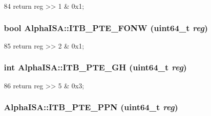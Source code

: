 \begin{DoxyCode}
84 { return reg >> 1 & 0x1; }
\end{DoxyCode}
\hypertarget{namespaceAlphaISA_aa80ea9dd70abdb33c458d4f99d4b3491}{
\subsubsection[{ITB\_\-PTE\_\-FONW}]{\setlength{\rightskip}{0pt plus 5cm}bool AlphaISA::ITB\_\-PTE\_\-FONW (uint64\_\-t {\em reg})}}
\label{namespaceAlphaISA_aa80ea9dd70abdb33c458d4f99d4b3491}



\begin{DoxyCode}
85 { return reg >> 2 & 0x1; }
\end{DoxyCode}
\hypertarget{namespaceAlphaISA_a9640ea9e1d42b4e0f47250c7efe687f9}{
\subsubsection[{ITB\_\-PTE\_\-GH}]{\setlength{\rightskip}{0pt plus 5cm}int AlphaISA::ITB\_\-PTE\_\-GH (uint64\_\-t {\em reg})}}
\label{namespaceAlphaISA_a9640ea9e1d42b4e0f47250c7efe687f9}



\begin{DoxyCode}
86 { return reg >> 5 & 0x3; }
\end{DoxyCode}
\hypertarget{namespaceAlphaISA_a6c2a97078ce2e44d3f04ee016e712c48}{
\subsubsection[{ITB\_\-PTE\_\-PPN}]{ AlphaISA::ITB\_\-PTE\_\-PPN (uint64\_\-t {\em reg})}}
\label{namespaceAlphaISA_a6c2a97078ce2e44d3f04ee016e712c48}



